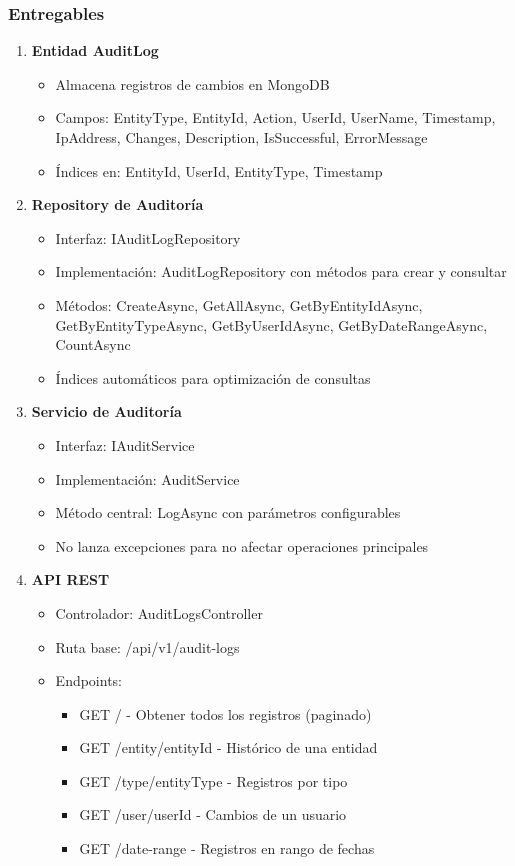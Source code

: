 \documentclass[12pt,a4paper]{article}
\begin{document}
\subsubsection{Entregables}

\begin{enumerate}
    \item \textbf{Entidad AuditLog}
    \begin{itemize}
        \item Almacena registros de cambios en MongoDB
        \item Campos: EntityType, EntityId, Action, UserId, UserName, Timestamp, IpAddress, Changes, Description, IsSuccessful, ErrorMessage
        \item Índices en: EntityId, UserId, EntityType, Timestamp
    \end{itemize}

    \item \textbf{Repository de Auditoría}
    \begin{itemize}
        \item Interfaz: IAuditLogRepository
        \item Implementación: AuditLogRepository con métodos para crear y consultar
        \item Métodos: CreateAsync, GetAllAsync, GetByEntityIdAsync, GetByEntityTypeAsync, GetByUserIdAsync, GetByDateRangeAsync, CountAsync
        \item Índices automáticos para optimización de consultas
    \end{itemize}

    \item \textbf{Servicio de Auditoría}
    \begin{itemize}
        \item Interfaz: IAuditService
        \item Implementación: AuditService
        \item Método central: LogAsync con parámetros configurables
        \item No lanza excepciones para no afectar operaciones principales
    \end{itemize}

    \item \textbf{API REST}
    \begin{itemize}
        \item Controlador: AuditLogsController
        \item Ruta base: /api/v1/audit-logs
        \item Endpoints:
        \begin{itemize}
            \item GET / - Obtener todos los registros (paginado)
            \item GET /entity/{entityId} - Histórico de una entidad
            \item GET /type/{entityType} - Registros por tipo
            \item GET /user/{userId} - Cambios de un usuario
            \item GET /date-range - Registros en rango de fechas
        \end{itemize}
    \end{itemize}


\end{enumerate}
\end{document}
